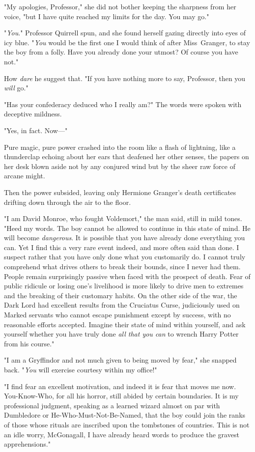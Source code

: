 "My apologies, Professor," she did not bother keeping the sharpness from her
voice, "but I have quite reached my limits for the day. You may go."

"\emph{You}." Professor Quirrell spun, and she found herself gazing directly
into eyes of icy blue. "\emph{You} would be the first one I would think of
after Miss~Granger, to stay the boy from a folly. Have you already done your
utmost? Of course you have not."

How \emph{dare} he suggest that. "If you have nothing more to say, Professor,
then you \emph{will} go."

"Has your confederacy deduced who I really am?" The words were spoken with
deceptive mildness.

"Yes, in fact. Now---"

Pure magic, pure power crashed into the room like a flash of lightning, like a
thunderclap echoing about her ears that deafened her other senses, the papers
on her desk blown aside not by any conjured wind but by the sheer raw force of
arcane might.

Then the power subsided, leaving only Hermione Granger's death certificates
drifting down through the air to the floor.

"I am David Monroe, who fought Voldemort," the man said, still in mild tones.
"Heed my words. The boy cannot be allowed to continue in this state of mind. He
will become \emph{dangerous}. It is possible that you have already done
everything you can. Yet I find this a very rare event indeed, and more often
said than done. I suspect rather that you have only done what you customarily
do. I cannot truly comprehend what drives others to break their bounds, since I
never had them. People remain surprisingly passive when faced with the prospect
of death. Fear of public ridicule or losing one's livelihood is more likely to
drive men to extremes and the breaking of their customary habits. On the other
side of the war, the Dark Lord had excellent results from the Cruciatus Curse,
judiciously used on Marked servants who cannot escape punishment except by
success, with no reasonable efforts accepted. Imagine their state of mind
within yourself, and ask yourself whether you have truly done \emph{all that
you can} to wrench Harry Potter from his course."

"I am a Gryffindor and not much given to being moved by fear," she snapped
back. "\emph{You} will exercise courtesy within my office!"

"I find fear an excellent motivation, and indeed it is fear that moves me now.
You-Know-Who, for all his horror, still abided by certain boundaries. It is my
professional judgment, speaking as a learned wizard almost on par with
Dumbledore or He-Who-Must-Not-Be-Named, that the boy could join the ranks of
those whose rituals are inscribed upon the tombstones of countries. This is not
an idle worry, McGonagall, I have already heard words to produce the gravest
apprehensions."

